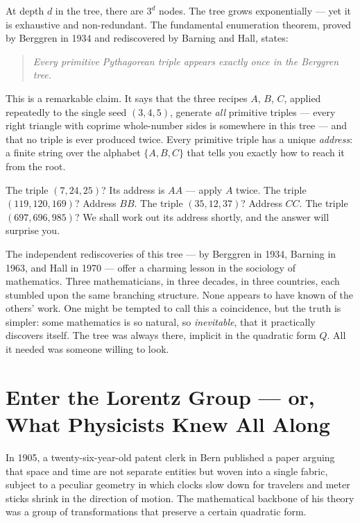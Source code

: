 \documentclass[11pt,twoside,openright]{book}
\theoremstyle{definition}
\theoremstyle{remark}
\begin{document}
At depth $d$ in the tree, there are $3^d$ nodes. The tree grows exponentially --- yet it is exhaustive and non-redundant. The fundamental enumeration theorem, proved by Berggren in 1934 and rediscovered by Barning and Hall, states:

\begin{quote}
\textit{Every primitive Pythagorean triple appears exactly once in the Berggren tree.}
\end{quote}
This is a remarkable claim. It says that the three recipes $A$, $B$, $C$, applied repeatedly to the single seed $(3, 4, 5)$, generate \textit{all} primitive triples --- every right triangle with coprime whole-number sides is somewhere in this tree --- and that no triple is ever produced twice. Every primitive triple has a unique \textit{address}: a finite string over the alphabet $\{A, B, C\}$ that tells you exactly how to reach it from the root.

The triple $(7, 24, 25)$? Its address is $AA$ --- apply $A$ twice. The triple $(119, 120, 169)$? Address $BB$. The triple $(35, 12, 37)$? Address $CC$. The triple $(697, 696, 985)$? We shall work out its address shortly, and the answer will surprise you.


The independent rediscoveries of this tree --- by Berggren in 1934, Barning in 1963, and Hall in 1970 --- offer a charming lesson in the sociology of mathematics. Three mathematicians, in three decades, in three countries, each stumbled upon the same branching structure. None appears to have known of the others' work. One might be tempted to call this a coincidence, but the truth is simpler: some mathematics is so natural, so \textit{inevitable}, that it practically discovers itself. The tree was always there, implicit in the quadratic form $Q$. All it needed was someone willing to look.


\section{Enter the Lorentz Group --- or, What Physicists Knew All Along}

In 1905, a twenty-six-year-old patent clerk in Bern published a paper arguing that space and time are not separate entities but woven into a single fabric, subject to a peculiar geometry in which clocks slow down for travelers and meter sticks shrink in the direction of motion. The mathematical backbone of his theory was a group of transformations that preserve a certain quadratic form.
\end{document}

